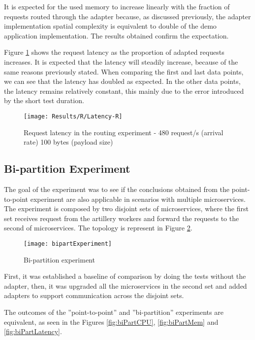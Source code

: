 It is expected for the used memory to increase linearly with the fraction of requests routed through the adapter because, as discussed previously,
the adapter implementation spatial complexity is equivalent to double of the demo application implementation.
The results obtained confirm the expectation.

Figure \ref{fig:routLatency} shows the request latency as the proportion of adapted requests increases.
It is expected that the latency will steadily increase, because of the same reasons previously stated.
When comparing the first and last data points, we can see that the latency has doubled as expected.
In the other data points, the latency remains relatively constant, this mainly due to the error introduced by the short test duration.

\begin{figure}[htbp]
    \centering
    \centerline{\texttt{[image: Results/R/Latency-R]}}
    \caption{Request latency in the routing experiment - 480 request/s (arrival rate) 100 bytes (payload size)}
    \label{fig:routLatency}
\end{figure}

\subsection{Bi-partition Experiment}

The goal of the experiment was to see if the conclusions obtained from the point-to-point experiment are also applicable in scenarios with multiple microservices.
The experiment is composed by two disjoint sets of microservices, where the first set receives request from the artillery workers and forward the requests to the second of microservices.
The topology is represent in Figure \ref{fig:biPart}.

\begin{figure}[htbp]
    \centering
    \centerline{\texttt{[image: bipartExperiment]}}
    \caption{Bi-partition experiment}
    \label{fig:biPart}
\end{figure}

First, it was established a baseline of comparison by doing the tests without the adapter,
then, it was upgraded all the microservices in the second set and added adapters to support communication across the disjoint sets.

The outcomes of the ''point-to-point'' and ''bi-partition'' experiments are equivalent, as seen in the Figures \ref{fig:biPartCPU}, \ref{fig:biPartMem} and \ref{fig:biPartLatency}.

